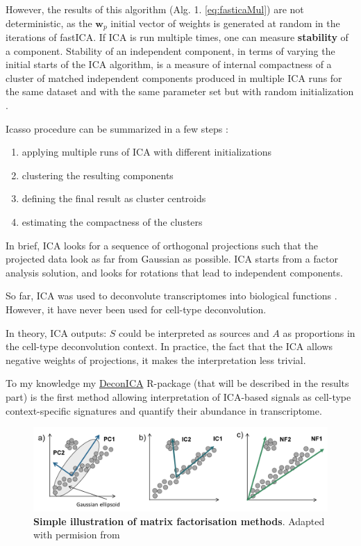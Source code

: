 \documentclass[12pt,]{book}
\providecommand{\tightlist}{%
  \setlength{\itemsep}{0pt}\setlength{\parskip}{0pt}}
\theoremstyle{definition}
\theoremstyle{definition}
\theoremstyle{definition}
\theoremstyle{remark}
\begin{document}
However, the results of this algorithm (Alg. 1. \eqref{eq:fasticaMul}) are
not deterministic, as the \(\mathbf{w}_{p}\) initial vector of weights
is generated at random in the iterations of fastICA. If ICA is run
multiple times, one can measure \textbf{stability} of a component.
Stability of an independent component, in terms of varying the initial
starts of the ICA algorithm, is a measure of internal compactness of a
cluster of matched independent components produced in multiple ICA runs
for the same dataset and with the same parameter set but with random
initialization \citep{Himberg2003}.

Icasso procedure can be summarized in a few steps :

\begin{enumerate}
\def\labelenumi{\arabic{enumi}.}
\tightlist
\item
  applying multiple runs of ICA with different initializations
\item
  clustering the resulting components
\item
  defining the final result as cluster centroids
\item
  estimating the compactness of the clusters
\end{enumerate}

In brief, ICA looks for a sequence of orthogonal projections such that
the projected data look as far from Gaussian as possible. ICA starts
from a factor analysis solution, and looks for rotations that lead to
independent components.

So far, ICA was used to deconvolute transcriptomes into biological
functions
\citep{Biton2014, Engreitz2010, Gorban2007, Teschendorff2007, Zinovyev2013}.
However, it have never been used for cell-type deconvolution.

In theory, ICA outputs: \(S\) could be interpreted as sources and \(A\)
as proportions in the cell-type deconvolution context. In practice, the
fact that the ICA allows negative weights of projections, it makes the
interpretation less trivial.

To my knowledge my \protect\hyperlink{DeconICA}{DeconICA} R-package
(that will be described in the results part) is the first method
allowing interpretation of ICA-based signals as cell-type
context-specific signatures and quantify their abundance in
transcriptome.

\begin{figure}

{\centering \includegraphics[width=0.8\linewidth]{figures-ext/bss} 

}

\caption[Simple illustration of matrix factorisation methods]{\textbf{Simple illustration of matrix
factorisation methods}. Adapted with permision from \citep{Zinovyev2013}}\label{fig:matrixfact}
\end{figure}
\end{document}
